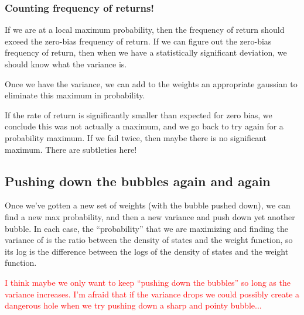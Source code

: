 \documentclass[letterpaper,twocolumn,amsmath,amssymb,pre,aps,10pt]{revtex4-1}
\begin{document}
\subsubsection{Counting frequency of returns!}
If we are at a local maximum probability, then the frequency of return
should exceed the zero-bias frequency of return.  If we can figure out
the zero-bias frequency of return, then when we have a statistically
significant deviation, we should know what the variance is.

Once we have the variance, we can add to the weights an appropriate
gaussian to eliminate this maximum in probability.

If the rate of return is significantly smaller than expected for zero
bias, we conclude this was not actually a maximum, and we go back to
try again for a probability maximum.  If we fail twice, then maybe
there is no significant maximum.  There are subtleties here!

\subsection{Pushing down the bubbles again and again}
Once we've gotten a new set of weights (with the bubble pushed down),
we can find a new max probability, and then a new variance and push
down yet another bubble.  In each case, the ``probability'' that we
are maximizing and finding the variance of is the ratio between the
density of states and the weight function, so its log is the
difference between the logs of the density of states and the weight
function.

\textcolor{red}{I think maybe we only want to keep ``pushing down the
  bubbles'' so long as the variance increases.  I'm afraid that if the
  variance drops we could possibly create a dangerous hole when we try
  pushing down a sharp and pointy bubble...}
\end{document}
